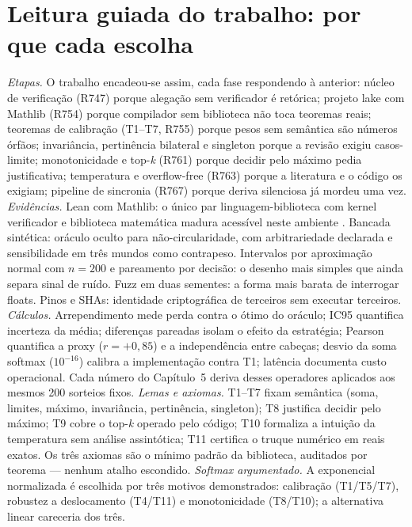 \section{Leitura guiada do trabalho: por que cada escolha}
\textit{Etapas.} O trabalho encadeou-se assim, cada fase respondendo à anterior: núcleo de verificação (R747) porque alegação sem verificador é retórica; projeto lake com Mathlib (R754) porque compilador sem biblioteca não toca teoremas reais; teoremas de calibração (T1--T7, R755) porque pesos sem semântica são números órfãos; invariância, pertinência bilateral e singleton porque a revisão exigiu casos-limite; monotonicidade e top-\textit{k} (R761) porque decidir pelo máximo pedia justificativa; temperatura e overflow-free (R763) porque a literatura e o código os exigiam; pipeline de sincronia (R767) porque deriva silenciosa já mordeu uma vez.
\textit{Evidências.} Lean com Mathlib: o único par linguagem-biblioteca com kernel verificador e biblioteca matemática madura acessível neste ambiente \cite{moura2021,mathlib2020}. Bancada sintética: oráculo oculto para não-circularidade, com arbitrariedade declarada e sensibilidade em três mundos como contrapeso. Intervalos por aproximação normal com $n=200$ e pareamento por decisão: o desenho mais simples que ainda separa sinal de ruído. Fuzz em duas sementes: a forma mais barata de interrogar floats. Pinos e SHAs: identidade criptográfica de terceiros sem executar terceiros.
\textit{Cálculos.} Arrependimento mede perda contra o ótimo do oráculo; IC95 quantifica incerteza da média; diferenças pareadas isolam o efeito da estratégia; Pearson quantifica a proxy ($r=+0{,}85$) e a independência entre cabeças; desvio da soma softmax ($10^{-16}$) calibra a implementação contra T1; latência documenta custo operacional. Cada número do Capítulo~5 deriva desses operadores aplicados aos mesmos 200 sorteios fixos.
\textit{Lemas e axiomas.} T1--T7 fixam semântica (soma, limites, máximo, invariância, pertinência, singleton); T8 justifica decidir pelo máximo; T9 cobre o top-\textit{k} operado pelo código; T10 formaliza a intuição da temperatura sem análise assintótica; T11 certifica o truque numérico em reais exatos. Os três axiomas são o mínimo padrão da biblioteca, auditados por teorema --- nenhum atalho escondido.
\textit{Softmax argumentado.} A exponencial normalizada é escolhida por três motivos demonstrados: calibração (T1/T5/T7), robustez a deslocamento (T4/T11) e monotonicidade (T8/T10); a alternativa linear careceria dos três.
